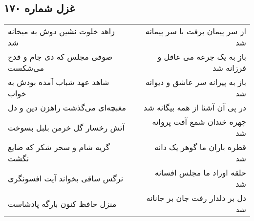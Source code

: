 \begin{center}
\section*{غزل شماره ۱۷۰}
\label{sec:sh170}
\begin{longtable}{l p{0.5cm} r}
زاهد خلوت نشین دوش به میخانه شد
&&
از سر پیمان برفت با سر پیمانه شد
\\
صوفی مجلس که دی جام و قدح می‌شکست
&&
باز به یک جرعه می عاقل و فرزانه شد
\\
شاهد عهد شباب آمده بودش به خواب
&&
باز به پیرانه سر عاشق و دیوانه شد
\\
مغبچه‌ای می‌گذشت راهزن دین و دل
&&
در پی آن آشنا از همه بیگانه شد
\\
آتش رخسار گل خرمن بلبل بسوخت
&&
چهره خندان شمع آفت پروانه شد
\\
گریه شام و سحر شکر که ضایع نگشت
&&
قطره باران ما گوهر یک دانه شد
\\
نرگس ساقی بخواند آیت افسونگری
&&
حلقه اوراد ما مجلس افسانه شد
\\
منزل حافظ کنون بارگه پادشاست
&&
دل بر دلدار رفت جان بر جانانه شد
\\
\end{longtable}
\end{center}
